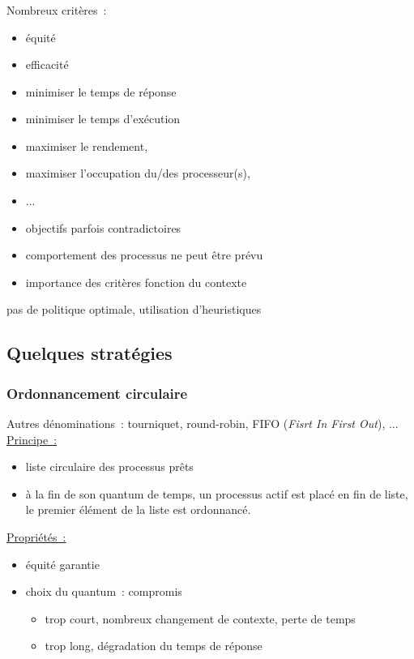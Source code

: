 \begin{frame}
  \frametitle{\insertsubsection}
  Nombreux critères~:
  \begin{itemize}
  \item équité
  \item efficacité
  \item minimiser le temps de réponse
  \item minimiser le temps d'exécution
  \item maximiser le rendement, 
  \item maximiser l'occupation du/des processeur(s),
  \item  ...
  \end{itemize}
  \vspace{0.5cm}
  
  \begin{itemize}
  \item[\ding{212}] \alert{objectifs} parfois \alert{contradictoires}
  \item[\ding{212}] comportement des processus ne peut être prévu
  \item[\ding{212}] importance des critères fonction du contexte
  \end{itemize}
  \vspace{0.5cm}
   \alert{pas de politique optimale}, utilisation d'\alert{heuristiques}
\end{frame}

\subsection{Quelques stratégies}
\begin{frame}
  \frametitle{Ordonnancement circulaire}
  
  Autres dénominations~: tourniquet, round-robin, FIFO (\emph{Fisrt In First Out}), ...\\
  \underline{Principe~:}
  \begin{itemize}
  \item liste circulaire des processus prêts
  \item à la fin de son quantum de temps, un processus actif est placé
    en fin de liste, le premier élément de la liste est ordonnancé.  
  \end{itemize}
  
  \underline{Propriétés~:}
    \begin{itemize}
    \item \alert{équité} garantie
    \item choix du quantum~: compromis 
      \begin{itemize}
      \item trop court, nombreux changement de contexte, perte de temps
      \item trop long, dégradation du temps de réponse
      \end{itemize}
    \end{itemize}
\end{frame}


